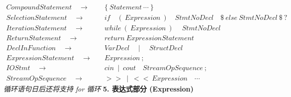 \documentclass[11pt]{article}
\begin{document}
    \begin{align*}
        CompoundStatement \quad \to&\quad \{\ Statement\ \cdots\ \} \\
        SelectionStatement \quad \to&\quad if\quad (\ Expression\ )\quad StmtNoDecl \quad \$\ else\ StmtNoDecl\ \$\ ? \\
        IterationStatement \quad \to&\quad while\ (\ Expression\ )\quad\ StmtNoDecl\\
        ReturnStatement \quad \to&\quad return\ ExpressionStatement \\
        DeclInFunction \quad \to&\quad VarDecl \quad\mid\quad StructDecl \\
        ExpressionStatement \quad \to&\quad Expression\ ; \\
        IOStmt \quad \to&\quad cin\ \mid\ cout\quad StreamOpSequence\ ; \\
        StreamOpSequence \quad \to&\quad >>\ \mid\ <<\ Expression\quad \cdots
    \end{align*}
    \textit{循环语句日后还将支持 for 循环}
    \newpage
    \textbf{5. 表达式部分 (Expression)} 
\end{document}
